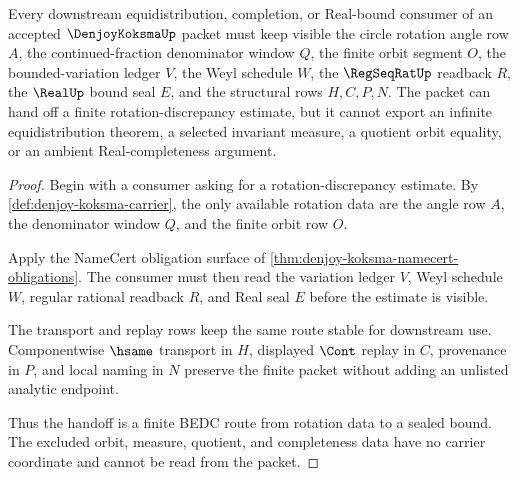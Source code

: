 \begin{theorem}
\label{thm:denjoy-koksma-rotation-handoff}
Every downstream equidistribution, completion, or Real-bound consumer of an accepted $\DenjoyKoksmaUp$ packet must keep visible the circle rotation angle row $A$, the continued-fraction denominator window $Q$, the finite orbit segment $O$, the bounded-variation ledger $V$, the Weyl schedule $W$, the $\RegSeqRatUp$ readback $R$, the $\RealUp$ bound seal $E$, and the structural rows $H,C,P,N$. The packet can hand off a finite rotation-discrepancy estimate, but it cannot export an infinite equidistribution theorem, a selected invariant measure, a quotient orbit equality, or an ambient Real-completeness argument.
\end{theorem}
\begin{proof}
Begin with a consumer asking for a rotation-discrepancy estimate. By \autoref{def:denjoy-koksma-carrier}, the only available rotation data are the angle row $A$, the denominator window $Q$, and the finite orbit row $O$.

Apply the NameCert obligation surface of \autoref{thm:denjoy-koksma-namecert-obligations}. The consumer must then read the variation ledger $V$, Weyl schedule $W$, regular rational readback $R$, and Real seal $E$ before the estimate is visible.

The transport and replay rows keep the same route stable for downstream use. Componentwise $\hsame$ transport in $H$, displayed $\Cont$ replay in $C$, provenance in $P$, and local naming in $N$ preserve the finite packet without adding an unlisted analytic endpoint.

Thus the handoff is a finite BEDC route from rotation data to a sealed bound. The excluded orbit, measure, quotient, and completeness data have no carrier coordinate and cannot be read from the packet.
\end{proof}



